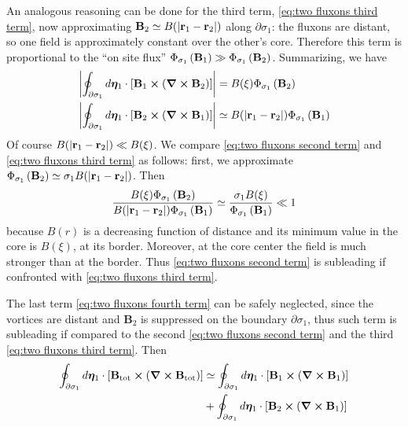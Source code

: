 An analogous reasoning can be done for the third term, \eqref{eq:two fluxons third term}, now approximating $\mathbf{B}_2 \simeq B(\abs{\mathbf{r}_1-\mathbf{r}_2})$ along $\partial\sigma_1$: the fluxons are distant, so one field is approximately constant over the other's core. Therefore this term is proportional to the ``on site flux'' $\Phi_{\sigma_1} \left({\mathbf{B}_1}\right) \gg \Phi_{\sigma_1} \left({\mathbf{B}_2}\right)$. Summarizing, we have
\[
\begin{aligned}
	\abs{\oint_{\partial\sigma_1} d\bm\eta_1 \cdot \left[{ \mathbf{B}_1 \bm{\times} \left({\curl\mathbf{B}_2 }\right) }\right]} &= B(\xi)\Phi_{\sigma_1} \left({\mathbf{B}_2}\right) \\
	\abs{\oint_{\partial\sigma_1} d\bm\eta_1 \cdot \left[{ \mathbf{B}_2 \bm{\times} \left({\curl\mathbf{B}_1 }\right) }\right]} &\simeq B(\abs{\mathbf{r}_1 - \mathbf{r}_2})\Phi_{\sigma_1} \left({\mathbf{B}_1}\right)
\end{aligned}
\]
Of course $B(\abs{\mathbf{r}_1 - \mathbf{r}_2}) \ll B(\xi)$. We compare \eqref{eq:two fluxons second term} and \eqref{eq:two fluxons third term} as follows: first, we approximate $\Phi_{\sigma_1} \left({\mathbf{B}_2}\right) \simeq \sigma_1 B(\abs{\mathbf{r}_1 - \mathbf{r}_2})$. Then
\[
	\frac{B(\xi)\Phi_{\sigma_1} \left({\mathbf{B}_2}\right)}{B(\abs{\mathbf{r}_1 - \mathbf{r}_2})\Phi_{\sigma_1} \left({\mathbf{B}_1}\right)} \simeq \frac{\sigma_1 B(\xi)}{\Phi_{\sigma_1} \left({\mathbf{B}_1}\right)} \ll 1
\]
because $B(r)$ is a decreasing function of distance and its minimum value in the core is $B(\xi)$, at its border. Moreover, at the core center the field is much stronger than at the border. Thus \eqref{eq:two fluxons second term} is subleading if confronted with \eqref{eq:two fluxons third term}.

The last term \eqref{eq:two fluxons fourth term} can be safely neglected, since the vortices are distant and $\mathbf{B}_2$ is suppressed on the boundary $\partial\sigma_1$, thus such term is subleading if compared to the second \eqref{eq:two fluxons second term} and the third \eqref{eq:two fluxons third term}. Then
\[
\begin{aligned}
	\oint_{\partial\sigma_1} d\bm\eta_1 \cdot \left[{ \mathbf{B}_\mathrm{tot} \bm{\times} \left({\curl\mathbf{B}_\mathrm{tot}}\right) }\right] &\simeq \oint_{\partial\sigma_1} d\bm\eta_1 \cdot \left[{ \mathbf{B}_1 \bm{\times} \left({\curl\mathbf{B}_1 }\right) }\right] \\
	&+ \oint_{\partial\sigma_1} d\bm\eta_1 \cdot \left[{ \mathbf{B}_2 \bm{\times} \left({\curl\mathbf{B}_1 }\right) }\right]
\end{aligned}
\]

